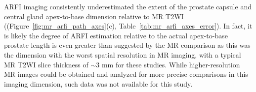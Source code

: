 ARFI imaging consistently underestimated the extent of the prostate capsule and
central gland apex-to-base dimension relative to MR T2WI
((Figure~\ref{fig:mr_arfi_path_axes}(c), Table~\ref{tab:mr_arfi_axes_error}).
In fact, it is likely the degree of ARFI estimation relative to the actual
apex-to-base prostate length is even greater than suggested by the MR
comparison as this was the dimension with the worst spatial resolution in MR
imaging, with a typical MR T2WI slice thickness of $\sim$3 mm for these
studies.  While higher-resolution MR images could be obtained and analyzed for
more precise comparisons in this imaging dimension, such data was not available
for this study. 
